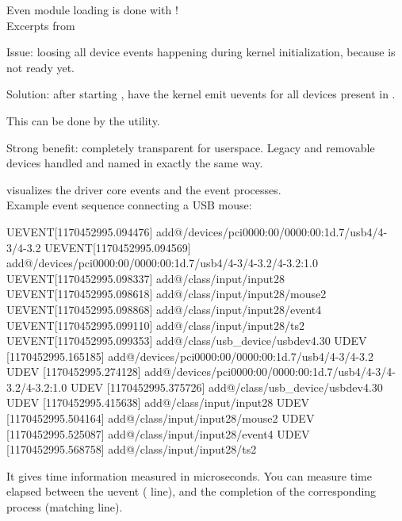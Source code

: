   Even module loading is done with !\\
  Excerpts from 

  \startitemize
  \item Issue: loosing all device events happening during kernel
    initialization, because \type{udev} is not ready yet.
  \item Solution: after starting , have the kernel emit
    uevents for all devices present in \type{/sys}.
  \item This can be done by the  utility.
  \item Strong benefit: completely transparent for userspace. Legacy
    and removable devices handled and named in exactly the same way.
  \stopitemize

   visualizes the driver core events and the  event processes.\\
  Example event sequence connecting a USB mouse:
  \begin{block}{}
\tiny
\starttyping
UEVENT[1170452995.094476] add@/devices/pci0000:00/0000:00:1d.7/usb4/4-3/4-3.2
UEVENT[1170452995.094569] add@/devices/pci0000:00/0000:00:1d.7/usb4/4-3/4-3.2/4-3.2:1.0
UEVENT[1170452995.098337] add@/class/input/input28
UEVENT[1170452995.098618] add@/class/input/input28/mouse2
UEVENT[1170452995.098868] add@/class/input/input28/event4
UEVENT[1170452995.099110] add@/class/input/input28/ts2
UEVENT[1170452995.099353] add@/class/usb_device/usbdev4.30
UDEV  [1170452995.165185] add@/devices/pci0000:00/0000:00:1d.7/usb4/4-3/4-3.2
UDEV  [1170452995.274128] add@/devices/pci0000:00/0000:00:1d.7/usb4/4-3/4-3.2/4-3.2:1.0
UDEV  [1170452995.375726] add@/class/usb_device/usbdev4.30
UDEV  [1170452995.415638] add@/class/input/input28
UDEV  [1170452995.504164] add@/class/input/input28/mouse2
UDEV  [1170452995.525087] add@/class/input/input28/event4
UDEV  [1170452995.568758] add@/class/input/input28/ts2
\stoptyping
\end{block}
It gives time information measured in microseconds. You can measure
time elapsed between the uevent (\type{UEVENT} line), and the completion of
the corresponding \type{udev} process (matching \type{UDEV} line).

